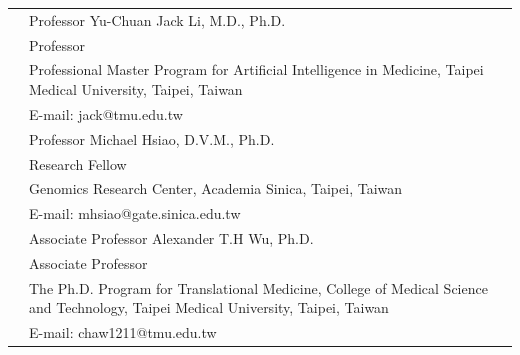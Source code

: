 \documentclass[letterpaper, 11pt]{article}
\begin{document}
\begin{longtable}{p{1.3in}p{4.8in}}
& Professor Yu-Chuan Jack Li, M.D.,  Ph.D.\\
& Professor\\
& Professional Master Program for Artificial Intelligence in Medicine, Taipei Medical University,
Taipei, Taiwan\\
& E-mail: jack@tmu.edu.tw\\[0.5cm]


& Professor Michael Hsiao, D.V.M., Ph.D.\\
& Research Fellow\\
& Genomics Research Center, 
Academia Sinica, Taipei, Taiwan\\
& E-mail: mhsiao@gate.sinica.edu.tw\\[0.5cm]

& Associate Professor Alexander T.H Wu, Ph.D.\\
& Associate Professor\\
& The Ph.D. Program for Translational Medicine,
College of Medical Science and Technology,
Taipei Medical University,
Taipei, Taiwan\\
& E-mail: chaw1211@tmu.edu.tw\\




\end{longtable}


\nohyphens{\color{OliveGreen}{Publications}} 
\printbibliography[heading=none] %

%
\nocite{*}

\end{document}
